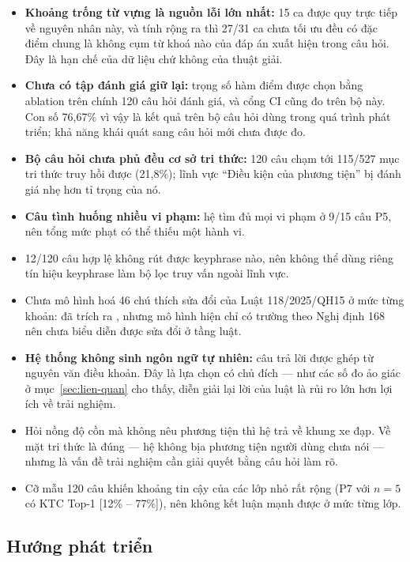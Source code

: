 \begin{itemize}
  \item \textbf{Khoảng trống từ vựng là nguồn lỗi lớn nhất:} 15 ca được quy trực tiếp về nguyên
        nhân này, và tính rộng ra thì 27/31 ca chưa tối ưu đều có đặc điểm chung là không cụm từ
        khoá nào của đáp án xuất hiện trong câu hỏi. Đây là hạn chế của dữ liệu chứ không của
        thuật giải.
  \item \textbf{Chưa có tập đánh giá giữ lại:} trọng số hàm điểm được chọn bằng ablation trên
        chính 120 câu hỏi đánh giá, và cổng CI cũng đo trên bộ này. Con số 76,67\% vì vậy là kết
        quả trên bộ câu hỏi dùng trong quá trình phát triển; khả năng khái quát sang câu hỏi mới
        chưa được đo.
  \item \textbf{Bộ câu hỏi chưa phủ đều cơ sở tri thức:} 120 câu chạm tới 115/527 mục tri thức
        truy hồi được (21,8\%); lĩnh vực ``Điều kiện của phương tiện'' bị đánh giá nhẹ hơn tỉ
        trọng của nó.
  \item \textbf{Câu tình huống nhiều vi phạm:} hệ tìm đủ mọi vi phạm ở 9/15 câu P5, nên tổng mức
        phạt có thể thiếu một hành vi.
  \item 12/120 câu hợp lệ không rút được keyphrase nào, nên không thể dùng riêng tín hiệu
        keyphrase làm bộ lọc truy vấn ngoài lĩnh vực.
  \item Chưa mô hình hoá 46 chú thích sửa đổi của Luật 118/2025/QH15 ở mức từng khoản: đã trích
        ra , nhưng mô hình  hiện chỉ có
        trường theo Nghị định 168 nên chưa biểu diễn được sửa đổi ở tầng luật.
  \item \textbf{Hệ thống không sinh ngôn ngữ tự nhiên:} câu trả lời được ghép từ nguyên văn điều
        khoản. Đây là lựa chọn có chủ đích --- như các số đo ảo giác ở mục~\ref{sec:lien-quan}
        cho thấy, diễn giải lại lời của luật là rủi ro lớn hơn lợi ích về trải nghiệm.
  \item Hỏi nồng độ cồn mà không nêu phương tiện thì hệ trả về khung xe đạp. Về mặt tri thức là
        đúng --- hệ không bịa phương tiện người dùng chưa nói --- nhưng là vấn đề trải nghiệm cần
        giải quyết bằng câu hỏi làm rõ.
  \item Cỡ mẫu 120 câu khiến khoảng tin cậy của các lớp nhỏ rất rộng (P7 với $n = 5$ có KTC
        Top-1 [12\% -- 77\%]), nên không kết luận mạnh được ở mức từng lớp.
\end{itemize}

\subsection{Hướng phát triển}
\label{sec:huong-phat-trien}

